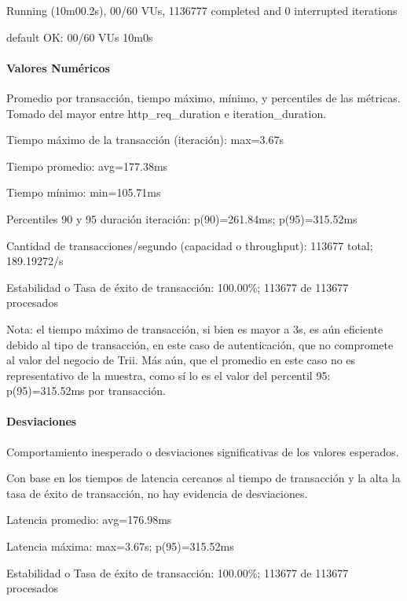 \documentclass[
  paper=a4,
  ,captions=tableheading
]{scrartcl}
\renewenvironment{quote}{\begin{customblockquote}\list{}{\rightmargin=0em\leftmargin=0em}%
\item\relax\color{blockquote-text}\ignorespaces}{\unskip\unskip\endlist\end{customblockquote}}
\begin{document}
\begin{quote}
Running (10m00.2s), 00/60 VUs, 1136777 completed and 0 interrupted
iterations

default OK: 00/60 VUs 10m0s
\end{quote}

\paragraph{Valores Numéricos}\label{sec:valores-numuxe9ricos-1}

Promedio por transacción, tiempo máximo, mínimo, y percentiles de las
métricas. Tomado del mayor entre http\_req\_duration e
iteration\_duration.

\begin{quote}
Tiempo máximo de la transacción (iteración): max=3.67s

Tiempo promedio: avg=177.38ms

Tiempo mínimo: min=105.71ms

Percentiles 90 y 95 duración iteración: p(90)=261.84ms; p(95)=315.52ms

Cantidad de transacciones/segundo (capacidad o throughput): 113677
total; 189.19272/s

Estabilidad o Tasa de éxito de transacción: 100.00\%; 113677 de 113677
procesados
\end{quote}

Nota: el tiempo máximo de transacción, si bien es mayor a 3s, es aún
eficiente debido al tipo de transacción, en este caso de autenticación,
que no compromete al valor del negocio de Trii. Más aún, que el promedio
en este caso no es representativo de la muestra, como sí lo es el valor
del percentil 95: p(95)=315.52ms por transacción.

\paragraph{Desviaciones}\label{sec:desviaciones-1}

Comportamiento inesperado o desviaciones significativas de los valores
esperados.

Con base en los tiempos de latencia cercanos al tiempo de transacción y
la alta la tasa de éxito de transacción, no hay evidencia de
desviaciones.

\begin{quote}
Latencia promedio: avg=176.98ms

Latencia máxima: max=3.67s; p(95)=315.52ms

Estabilidad o Tasa de éxito de transacción: 100.00\%; 113677 de 113677
procesados
\end{quote}
\end{document}
